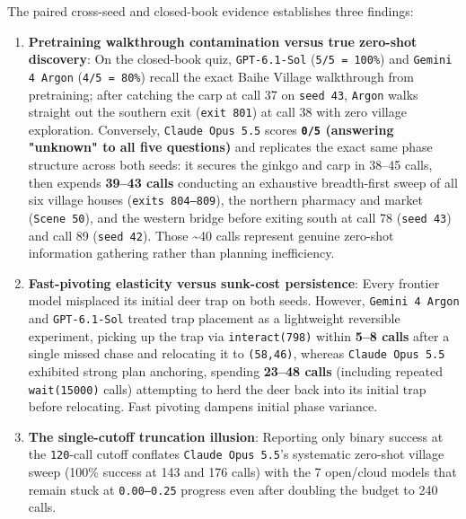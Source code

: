 \documentclass[11pt,a4paper]{article}
\begin{document}
The paired cross-seed and closed-book evidence establishes three findings:
\begin{enumerate}
\item \textbf{Pretraining walkthrough contamination versus true zero-shot discovery}: On the closed-book quiz, \texttt{GPT\allowbreak{}-\allowbreak{}6\allowbreak{}.\allowbreak{}1\allowbreak{}-\allowbreak{}Sol} (\texttt{5\allowbreak{}/\allowbreak{}5\allowbreak{} \allowbreak{}=\allowbreak{} \allowbreak{}100\%}) and \texttt{Gemini\allowbreak{} \allowbreak{}4\allowbreak{} \allowbreak{}Argon} (\texttt{4\allowbreak{}/\allowbreak{}5\allowbreak{} \allowbreak{}=\allowbreak{} \allowbreak{}80\%}) recall the exact Baihe Village walkthrough from pretraining; after catching the carp at call 37 on \texttt{seed\allowbreak{} \allowbreak{}43}, \texttt{Argon} walks straight out the southern exit (\texttt{exit\allowbreak{} \allowbreak{}801}) at call 38 with zero village exploration. Conversely, \texttt{Claude\allowbreak{} \allowbreak{}Opus\allowbreak{} \allowbreak{}5\allowbreak{}.\allowbreak{}5} scores \textbf{\texttt{0\allowbreak{}/\allowbreak{}5} (answering "unknown" to all five questions)} and replicates the exact same phase structure across both seeds: it secures the ginkgo and carp in 38--45 calls, then expends \textbf{39--43 calls} conducting an exhaustive breadth-first sweep of all six village houses (\texttt{exits\allowbreak{} \allowbreak{}804--809}), the northern pharmacy and market (\texttt{Scene\allowbreak{} \allowbreak{}50}), and the western bridge before exiting south at call 78 (\texttt{seed\allowbreak{} \allowbreak{}43}) and call 89 (\texttt{seed\allowbreak{} \allowbreak{}42}). Those \textasciitilde{}40 calls represent genuine zero-shot information gathering rather than planning inefficiency.
\item \textbf{Fast-pivoting elasticity versus sunk-cost persistence}: Every frontier model misplaced its initial deer trap on both seeds. However, \texttt{Gemini\allowbreak{} \allowbreak{}4\allowbreak{} \allowbreak{}Argon} and \texttt{GPT\allowbreak{}-\allowbreak{}6\allowbreak{}.\allowbreak{}1\allowbreak{}-\allowbreak{}Sol} treated trap placement as a lightweight reversible experiment, picking up the trap via \texttt{interact\allowbreak{}(798)} within \textbf{5--8 calls} after a single missed chase and relocating it to \texttt{(58\allowbreak{},\allowbreak{}46)}, whereas \texttt{Claude\allowbreak{} \allowbreak{}Opus\allowbreak{} \allowbreak{}5\allowbreak{}.\allowbreak{}5} exhibited strong plan anchoring, spending \textbf{23--48 calls} (including repeated \texttt{wait(150\allowbreak{}00)} calls) attempting to herd the deer back into its initial trap before relocating. Fast pivoting dampens initial phase variance.
\item \textbf{The single-cutoff truncation illusion}: Reporting only binary success at the \texttt{120}-call cutoff conflates \texttt{Claude\allowbreak{} \allowbreak{}Opus\allowbreak{} \allowbreak{}5\allowbreak{}.\allowbreak{}5}'s systematic zero-shot village sweep (100\% success at 143 and 176 calls) with the 7 open/cloud models that remain stuck at \texttt{0\allowbreak{}.\allowbreak{}00--0\allowbreak{}.\allowbreak{}25} progress even after doubling the budget to 240 calls.

\end{enumerate}
\end{document}
